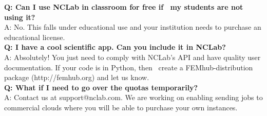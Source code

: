 \documentclass{article}
\begin{document}
\noindent 
{\bf Q: Can I use NCLab in classroom for free if  my students are not using it? }\\

\noindent 
A: No. This falls under educational use and your institution needs to purchase an educational license.\\

\noindent 
{\bf Q: I have a cool scientific app. Can you include it in NCLab?}\\

\noindent 
A: Absolutely! You just need to comply with NCLab’s API and have quality user documentation. 
If your code is in Python, then  create a FEMhub-distribution package (http://femhub.org) and let us know.\\

\noindent 
{\bf Q: What if I need to go over the quotas temporarily?}\\

\noindent 
A: Contact us at support@nclab.com. We are working on enabling sending jobs to commercial 
clouds where you will be able to purchase your own instances. \\
\end{document}
